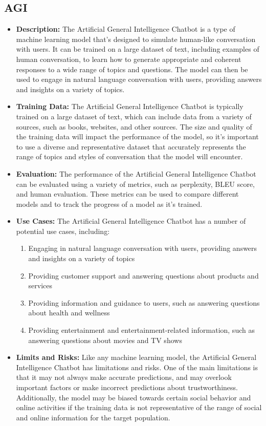 \subsection{AGI}

\begin{itemize}
    \item \textbf{Description:} The Artificial General Intelligence Chatbot is a type of machine learning model that's designed to simulate human-like conversation with users. It can be trained on a large dataset of text, including examples of human conversation, to learn how to generate appropriate and coherent responses to a wide range of topics and questions. The model can then be used to engage in natural language conversation with users, providing answers and insights on a variety of topics.
    \item \textbf{Training Data:} The Artificial General Intelligence Chatbot is typically trained on a large dataset of text, which can include data from a variety of sources, such as books, websites, and other sources. The size and quality of the training data will impact the performance of the model, so it's important to use a diverse and representative dataset that accurately represents the range of topics and styles of conversation that the model will encounter.
    \item \textbf{Evaluation:} The performance of the Artificial General Intelligence Chatbot can be evaluated using a variety of metrics, such as perplexity, BLEU score, and human evaluation. These metrics can be used to compare different models and to track the progress of a model as it's trained.
    \item \textbf{Use Cases:} The Artificial General Intelligence Chatbot has a number of potential use cases, including:
        \begin{enumerate}  
            \item Engaging in natural language conversation with users, providing answers and insights on a variety of topics
            \item Providing customer support and answering questions about products and services
            \item Providing information and guidance to users, such as answering questions about health and wellness
            \item Providing entertainment and entertainment-related information, such as answering questions about movies and TV shows
        \end{enumerate}
    \item \textbf{Limits and Risks:} Like any machine learning model, the Artificial General Intelligence Chatbot has limitations and risks. One of the main limitations is that it may not always make accurate predictions, and may overlook important factors or make incorrect predictions about trustworthiness. Additionally, the model may be biased towards certain social behavior and online activities if the training data is not representative of the range of social and online information for the target population.

\end{itemize}

